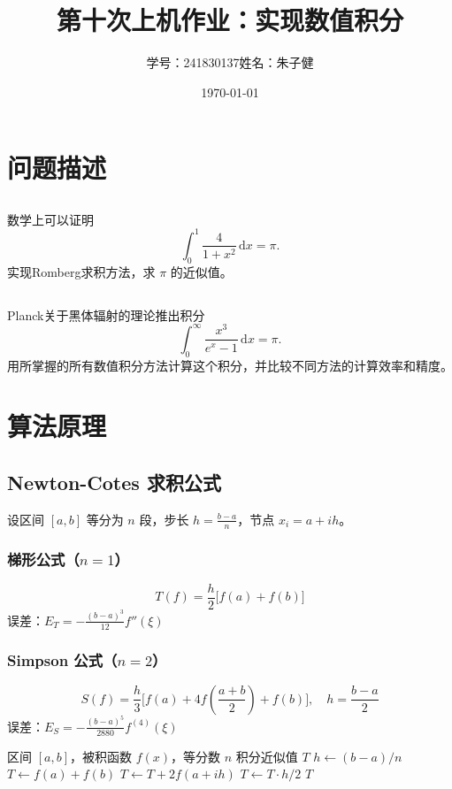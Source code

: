 \documentclass{article}
\title{第十次上机作业：实现数值积分}
\author{学号：241830137\quad 姓名：朱子健}
\date{\today}
\begin{document}
\maketitle

\section{问题描述}
\subsection{}
数学上可以证明
\begin{equation}
    \int_{0}^{1} \frac{4}{1 + x^{2}} \, \mathrm{d}x = \pi .
\end{equation}
实现Romberg求积方法，求 $\pi$ 的近似值。
\subsection{}
Planck关于黑体辐射的理论推出积分
\begin{equation}
    \int_{0}^{\infty} \frac{x^{3}}{e^{x}-1} \, \mathrm{d}x = \pi .
\end{equation}
用所掌握的所有数值积分方法计算这个积分，并比较不同方法的计算效率和精度。
\section{算法原理}

\subsection{Newton-Cotes 求积公式}

设区间 \([a,b]\) 等分为 \(n\) 段，步长 \(h = \frac{b-a}{n}\)，节点 \(x_i = a + i h\)。

\subsubsection{梯形公式（\(n=1\)）}
\[
T(f) = \frac{h}{2}\big[f(a) + f(b)\big]
\]
误差：\(E_T = -\frac{(b-a)^3}{12}f''(\xi)\)

\subsubsection{Simpson 公式（\(n=2\)）}
\[
S(f) = \frac{h}{3}\big[f(a) + 4f(\frac{a+b}{2}) + f(b)\big],\quad h = \frac{b-a}{2}
\]
误差：\(E_S = -\frac{(b-a)^5}{2880}f^{(4)}(\xi)\)

\begin{algorithm}[H]
\caption{复合梯形求积}
\begin{algorithmic}[1]
\REQUIRE 区间 \([a,b]\)，被积函数 \(f(x)\)，等分数 \(n\)
\ENSURE 积分近似值 \(T\)
\STATE \(h \gets (b-a)/n\)
\STATE \(T \gets f(a) + f(b)\)
    \STATE \(T \gets T + 2f(a + i h)\)
\ENDFOR
\STATE \(T \gets T \cdot h / 2\)
\RETURN \(T\)
\end{algorithmic}
\end{algorithm}
\end{document}
